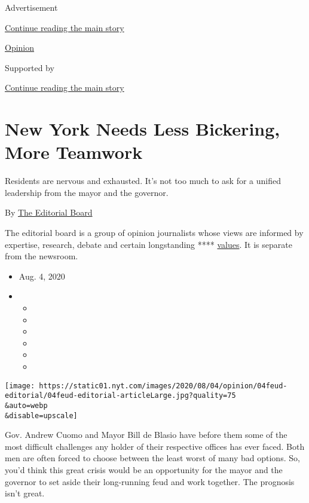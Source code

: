Advertisement

\protect\hyperlink{after-top}{Continue reading the main story}

\href{/section/opinion}{Opinion}

Supported by

\protect\hyperlink{after-sponsor}{Continue reading the main story}

\hypertarget{new-york-needs-less-bickering-more-teamwork}{%
\section{New York Needs Less Bickering, More
Teamwork}\label{new-york-needs-less-bickering-more-teamwork}}

Residents are nervous and exhausted. It's not too much to ask for a
unified leadership from the mayor and the governor.

By
\href{https://www.nytimes.com/interactive/opinion/editorialboard.html}{The
Editorial Board}

The editorial board is a group of opinion journalists whose views are
informed by expertise, research, debate and certain longstanding ****
\href{https://www.nytimes.com/interactive/2018/opinion/editorialboard.html}{values}.
It is separate from the newsroom.

\begin{itemize}
\item
  Aug. 4, 2020
\item
  \begin{itemize}
  \item
  \item
  \item
  \item
  \item
  \item
  \end{itemize}
\end{itemize}

\texttt{[image: https://static01.nyt.com/images/2020/08/04/opinion/04feud-editorial/04feud-editorial-articleLarge.jpg?quality=75\\\&auto=webp\\\&disable=upscale]}

Gov. Andrew Cuomo and Mayor Bill de Blasio have before them some of the
most difficult challenges any holder of their respective offices has
ever faced. Both men are often forced to choose between the least worst
of many bad options. So, you'd think this great crisis would be an
opportunity for the mayor and the governor to set aside their
long-running feud and work together. The prognosis isn't great.

